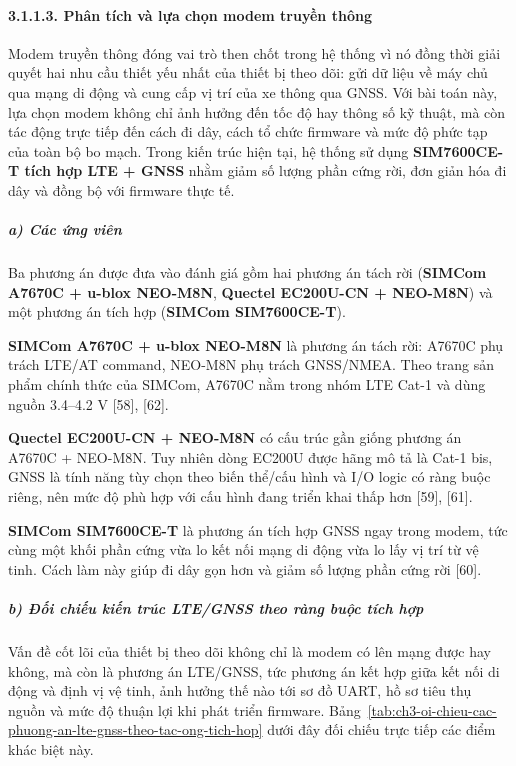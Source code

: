 \documentclass[a4paper]{extarticle}
\newcommand{\tabref}[1]{Bảng~\ref{#1}}
\begin{document}
\paragraph{3.1.1.3. Phân tích và lựa chọn modem truyền
thông}\label{3113-phuxe2n-tuxedch-vuxe0-lux1ef1a-chux1ecdn-modem-truyux1ec1n-thuxf4ng}

Modem truyền thông đóng vai trò then chốt trong hệ thống vì nó đồng thời
giải quyết hai nhu cầu thiết yếu nhất của thiết bị theo dõi: gửi dữ liệu về máy chủ
qua mạng di động và cung cấp vị trí của xe thông qua GNSS. Với bài toán
này, lựa chọn modem không chỉ ảnh hưởng đến tốc độ hay thông số kỹ
thuật, mà còn tác động trực tiếp đến cách đi dây, cách tổ chức firmware
và mức độ phức tạp của toàn bộ bo mạch. Trong kiến trúc hiện tại, hệ
thống sử dụng \textbf{SIM7600CE-T tích hợp LTE + GNSS} nhằm giảm số
lượng phần cứng rời, đơn giản hóa đi dây và đồng bộ với firmware thực
tế.

\subparagraph{a) Các ứng viên}\label{a-cuxe1c-ux1ee9ng-viuxean-1}

Ba phương án được đưa vào đánh giá gồm hai phương án tách rời
(\textbf{SIMCom A7670C + u-blox NEO-M8N}, \textbf{Quectel EC200U-CN +
NEO-M8N}) và một phương án tích hợp (\textbf{SIMCom SIM7600CE-T}).

\textbf{SIMCom A7670C + u-blox NEO-M8N} là phương án tách rời: A7670C
phụ trách LTE/AT command, NEO-M8N phụ trách GNSS/NMEA. Theo trang sản
phẩm chính thức của SIMCom, A7670C nằm trong nhóm LTE Cat-1 và dùng
nguồn 3.4--4.2 V {[}58{]}, {[}62{]}.

\textbf{Quectel EC200U-CN + NEO-M8N} có cấu trúc gần giống phương án
A7670C + NEO-M8N. Tuy nhiên dòng EC200U được hãng mô tả là Cat-1 bis,
GNSS là tính năng tùy chọn theo biến thể/cấu hình và I/O logic có ràng
buộc riêng, nên mức độ phù hợp với cấu hình đang triển khai thấp hơn
{[}59{]}, {[}61{]}.

\textbf{SIMCom SIM7600CE-T} là phương án tích hợp GNSS ngay trong modem,
tức cùng một khối phần cứng vừa lo kết nối mạng di động vừa lo lấy vị trí
từ vệ tinh. Cách làm này giúp đi dây gọn hơn và giảm số lượng phần cứng
rời {[}60{]}.

\subparagraph{b) Đối chiếu kiến trúc LTE/GNSS theo ràng buộc tích
hợp}\label{b-ux111ux1ed1i-chiux1ebfu-kiux1ebfn-truxfac-ltegnss-theo-ruxe0ng-buux1ed9c-tuxedch-hux1ee3p}

Vấn đề cốt lõi của thiết bị theo dõi không chỉ là modem có lên mạng được hay
không, mà còn là phương án LTE/GNSS, tức phương án kết hợp giữa kết nối
di động và định vị vệ tinh, ảnh hưởng thế nào tới sơ đồ UART, hồ sơ tiêu
thụ nguồn và mức độ thuận lợi khi phát triển firmware.
\tabref{tab:ch3-oi-chieu-cac-phuong-an-lte-gnss-theo-tac-ong-tich-hop}
dưới đây đối chiếu trực tiếp các điểm khác biệt này.
\end{document}
